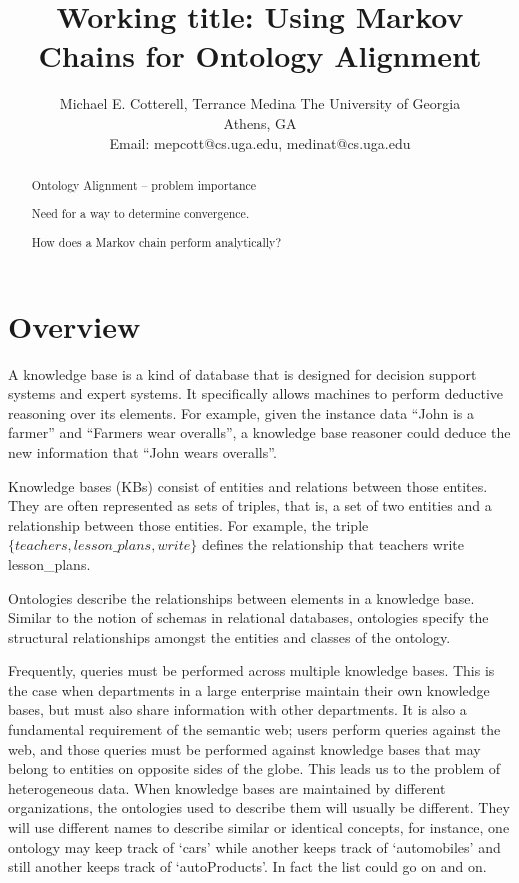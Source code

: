\documentclass[letterpaper,twocolumn,10pt]{article}
\begin{document}
\title{Working title: Using Markov Chains for Ontology Alignment}

\author{Michael E. Cotterell,
				Terrance Medina
The University of Georgia\\
Athens, GA\\
Email: mepcott@cs.uga.edu, medinat@cs.uga.edu
}

\maketitle

\begin{abstract}
Ontology Alignment -- problem importance

Need for a way to determine convergence.

How does a Markov chain perform analytically?

\end{abstract}


\section{Overview}

A knowledge base is a kind of database that is designed 
for decision support systems and expert systems. It specifically allows
machines to perform deductive reasoning over its elements.
For example, given the instance data ``John is a farmer'' and ``Farmers
wear overalls'', a knowledge base reasoner could deduce the new information
that ``John wears overalls''.

Knowledge bases (KBs) consist of entities and
relations between those entites. They are often represented as sets of
triples, that is, a set of two entities and a relationship between those
entities. For example, the triple ${\{teachers, lesson\_plans, write\}}$
defines the relationship that teachers write lesson\_plans.

Ontologies describe the relationships between elements in a knowledge base.
Similar to the notion of schemas in relational databases, ontologies specify
the structural relationships amongst the entities and classes of the ontology.

Frequently, queries must be performed across multiple knowledge bases. This is the
case when departments in a large enterprise maintain their own knowledge bases,
but must also share information with other departments. It is also a fundamental
requirement of the semantic web; users perform queries against the web,
and those queries must be performed against knowledge bases that may belong to 
entities on opposite sides of the globe. This leads us to the problem of heterogeneous
data. When knowledge bases are maintained by different organizations, the ontologies
used to describe them will usually be different. They will use different names
to describe similar or identical concepts, for instance, one ontology may keep track
of `cars' while another keeps track of `automobiles' and still another keeps track of 
`autoProducts'. In fact the list could go on and on.
\end{document}
